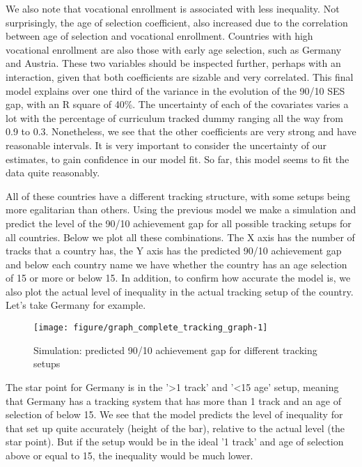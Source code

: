 \documentclass[11pt, a4paper]{article}\usepackage[]{graphicx}\usepackage[]{color}
\begin{document}
We also note that vocational enrollment is associated with less inequality. Not surprisingly, the age of selection coefficient, also increased due to the correlation between age of selection and vocational enrollment. Countries with high vocational enrollment are also those with early age selection, such as Germany and Austria. These two variables should be inspected further, perhaps with an interaction, given that both coefficients are sizable and very correlated. This final model explains over one third of the variance in the evolution of the 90/10 SES gap, with an R square of 40\%. The uncertainty of each of the covariates varies a lot with the percentage of curriculum tracked dummy ranging all the way from 0.9 to 0.3. Nonetheless, we see that the other coefficients are very strong and have reasonable intervals. It is very important to consider the uncertainty of our estimates, to gain confidence in our model fit. So far, this model seems to fit the data quite reasonably.

All of these countries have a different tracking structure, with some setups being more egalitarian than others. Using the previous model we make a simulation and predict the level of the 90/10 achievement gap for all possible tracking setups for all countries. Below we plot all these combinations. The X axis has the number of tracks that a country has, the Y axis has the predicted 90/10 achievement gap and below each country name we have whether the country has an age selection of 15 or more or below 15. In addition, to confirm how accurate the model is, we also plot the actual level of inequality in the actual tracking setup of the country. Let's take Germany for example.



\begin{figure}

{\centering \texttt{[image: figure/graph\_complete\_tracking\_graph-1]} 

}

\caption[Simulation]{Simulation: predicted 90/10 achievement gap for different tracking setups}\label{fig:graph_complete_tracking_graph}
\end{figure}



The star point for Germany is in the '\textgreater 1 track' and '\textless 15 age' setup, meaning that Germany has a tracking system that has more than 1 track and an age of selection of below 15. We see that the model predicts the level of inequality for that set up quite accurately (height of the bar), relative to the actual level (the star point). But if the setup would be in the ideal '1 track' and age of selection above or equal to 15, the inequality would be much lower. 
\end{document}
